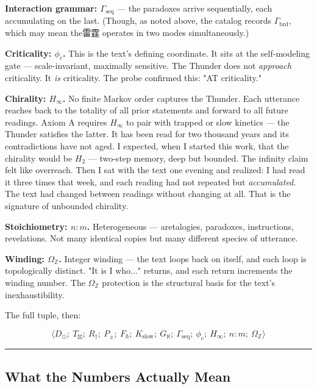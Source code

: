 \documentclass[12pt,a4paper]{article}
\begin{document}
\textbf{Interaction grammar: $\Gamma_\text{seq}$} --- the paradoxes arrive sequentially, each accumulating on the last. (Though, as noted above, the catalog records $\Gamma_\text{brd}$, which may mean the雷霆 operates in two modes simultaneously.)

\textbf{Criticality: $\phi_c$.} This is the text's defining coordinate. It sits at the self-modeling gate --- scale-invariant, maximally sensitive. The Thunder does not \emph{approach} criticality. It \emph{is} criticality. The probe confirmed this: "AT criticality."

\textbf{Chirality: $H_{\infty}$.} No finite Markov order captures the Thunder. Each utterance reaches back to the totality of all prior statements and forward to all future readings. Axiom A requires $H_{\infty}$ to pair with trapped or slow kinetics --- the Thunder satisfies the latter. It has been read for two thousand years and its contradictions have not aged. I expected, when I started this work, that the chirality would be $H_2$ --- two-step memory, deep but bounded. The infinity claim felt like overreach. Then I sat with the text one evening and realized: I had read it three times that week, and each reading had not repeated but \emph{accumulated}. The text had changed between readings without changing at all. That is the signature of unbounded chirality.

\textbf{Stoichiometry: $n{:}m$.} Heterogeneous --- aretalogies, paradoxes, instructions, revelations. Not many identical copies but many different species of utterance.

\textbf{Winding: $\Omega_\mathbb{Z}$.} Integer winding --- the text loops back on itself, and each loop is topologically distinct. "It is I who..." returns, and each return increments the winding number. The $\Omega_\mathbb{Z}$ protection is the structural basis for the text's inexhaustibility.

The full tuple, then:

\[\langle D_{\odot};\ T_{\boxtimes};\ R_{\dagger};\ P_{\pm};\ F_{\hbar};\ K_\text{slow};\ G_{\aleph};\ \Gamma_\text{seq};\ \phi_c;\ H_{\infty};\ n{:}m;\ \Omega_\mathbb{Z} \rangle\]

\begin{center}
\rule{0.5\textwidth}{0.4pt}
\end{center}

\subsection{What the Numbers Actually Mean}
\end{document}
